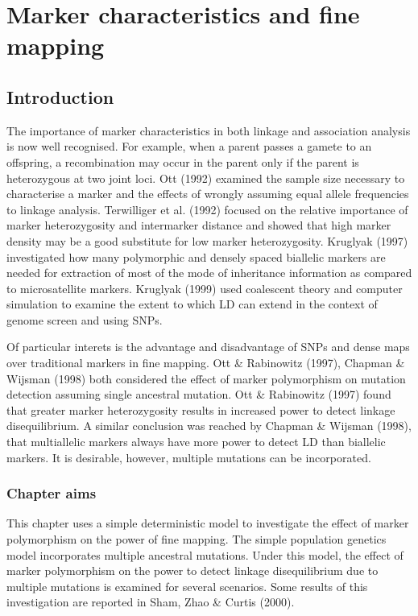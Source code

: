 
\chapter{Marker characteristics and fine mapping}

\section{Introduction}

The importance of marker characteristics in both linkage and association
analysis is now well recognised.  For example, when a parent passes a gamete
to an offspring, a recombination may occur in the parent only if the parent is
heterozygous at two joint loci.  Ott (1992) examined the sample size necessary
to characterise a marker and the effects of wrongly assuming equal allele
frequencies to linkage analysis.  Terwilliger et al.  (1992) focused on the
relative importance of marker heterozygosity and intermarker distance and
showed that high marker density may be a good substitute for low marker
heterozygosity.  Kruglyak (1997) investigated how many polymorphic and densely
spaced biallelic markers are needed for extraction of most of the mode of
inheritance information as compared to microsatellite markers.  Kruglyak (1999)
used coalescent theory and computer simulation to examine the extent to which
LD can extend in the context of genome screen and using SNPs.

Of particular interets is the advantage and disadvantage of SNPs and dense maps
over traditional markers in fine mapping.  Ott \& Rabinowitz (1997), Chapman
\& Wijsman (1998) both considered the effect of marker polymorphism on
mutation detection assuming single ancestral mutation.  Ott \& Rabinowitz
(1997) found that greater marker heterozygosity results in increased power
to detect linkage disequilibrium. A similar conclusion was reached by Chapman
\& Wijsman (1998), that multiallelic markers always have more power to detect
LD than biallelic markers.  It is desirable, however, multiple mutations can be
incorporated.

\subsection*{Chapter aims}

This chapter uses a simple deterministic model to investigate the effect of
marker polymorphism on the power of fine mapping.  The simple population
genetics model incorporates multiple ancestral mutations.  Under this model,
the effect of marker polymorphism on the power to detect linkage disequilibrium
due to multiple mutations is examined for several scenarios.  Some results of
this investigation are reported in Sham, Zhao \& Curtis (2000).


